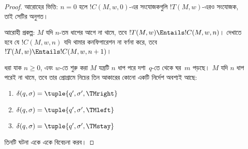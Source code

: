 \documentclass[../../../include/open-logic-section]{subfiles}
\begin{document}
\begin{proof}
আরোহের ভিত্তি: $n=0$ হলে $!C(M,w,0)$-এর সংযোজকগুলি
$!T(M,w)$-এরও সংযোজক, তাই সেটির অনুগত।

আরোহী প্রকল্প: $M$ যদি $n$-তম ধাপের আগে না থামে, তবে
$!T(M,w)\Entails !C(M,w,n)$। দেখাতে হবে যে $!C(M,w,n)$ যদি থামার
কনফিগারেশন না বর্ণনা করে, তবে
$!T(M,w)\Entails !C(M,w,n+1)$।

ধরা যাক $n\ge 0$, এবং $w$-তে শুরু করা $M$ যন্ত্রটি $n$ ধাপ পরে
দশা~$q$-তে থেকে ঘর~$m$ পড়ছে। $M$ যদি $n$ ধাপ পরেই না থামে, তবে তার
প্রোগ্রামে নিচের তিন আকারের কোনো একটি নির্দেশ অবশ্যই আছে:


\begin{enumerate}
\item {} $\delta(q,\sigma)=\tuple{q',\sigma',\TMright}$

\item {} $\delta(q,\sigma)=\tuple{q',\sigma',\TMleft}$

\item {} $\delta(q,\sigma)=\tuple{q',\sigma',\TMstay}$
\end{enumerate}

তিনটি ঘটনা একে একে বিবেচনা করব।


\end{proof}
\end{document}
